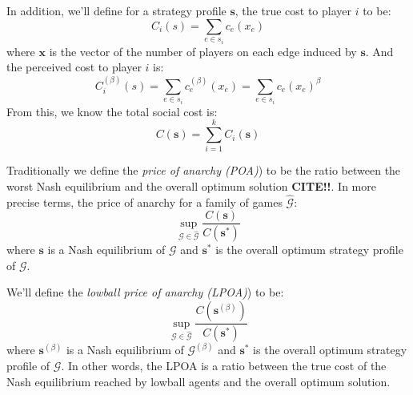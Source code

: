 \documentclass[twoside]{article}
\newcommand{\pbet}{^{(\beta)}}
\newcommand{\s}{\mathbf{s}}
\newcommand{\cit}{\textbf{CITE!!}}
\begin{document}
\begin{multicols}{2}
In addition, we'll define for a strategy profile $\mathbf{s}$, the true cost to player $i$ to be: \[C_i(s) = \sum\limits_{e \in s_i}c_e(x_e)\] where $\mathbf{x}$ is the vector of the number of players on each edge induced by $\mathbf{s}$.  And the perceived cost to player $i$ is: \[C\pbet_i(s) = \sum\limits_{e \in s_i}c_e\pbet(x_e) = \sum\limits_{e \in s_i}c_e(x_e)^\beta\]  From this, we know the total social cost is: \[C(\mathbf{s}) = \sum_{i=1}^{k}C_i(\mathbf{s})\]
        
Traditionally we define the \textit{price of anarchy (POA)}) to be the ratio between the worst Nash equilibrium and the overall optimum solution \cit.  In more precise terms, the price of anarchy for a family of games $\hat{\mathcal{G}}$: \[\sup_{\mathcal{G} \in \hat{\mathcal{G}}} \frac{C(\s)}{C(\s^*)}\] where $\s$ is a Nash equilibrium of $\mathcal{G}$ and $\s^*$ is the overall optimum strategy profile of $\mathcal{G}$.

We'll define the \textit{lowball price of anarchy (LPOA)}) to be: \[\sup_{\mathcal{G} \in \hat{\mathcal{G}}} \frac{C(\s\pbet)}{C(\s^*)}\] where $\s\pbet$ is a Nash equilibrium of $\mathcal{G\pbet}$ and $\s^*$ is the overall optimum strategy profile of $\mathcal{G}$.  In other words, the LPOA is a ratio between the true cost of the Nash equilibrium reached by lowball agents and the overall optimum solution.







\end{multicols}
\end{document}
